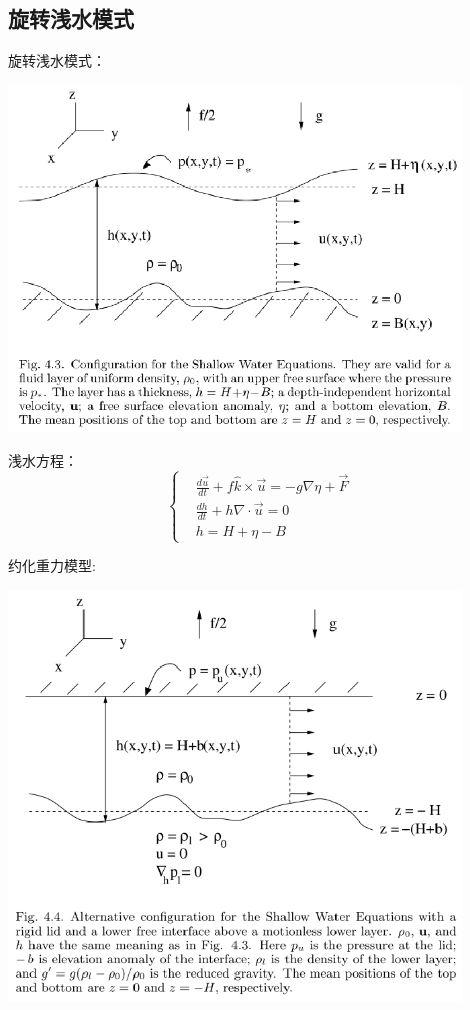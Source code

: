 \documentclass{article}
\begin{document}
\subsection{旋转浅水模式}
旋转浅水模式：
\begin{center}
    \includegraphics[width=12cm]{Fig3_1.png}
\end{center}

浅水方程：
$$\begin{cases}
    &\frac{d\vec{u}}{dt} + f\hat{k}\times\vec{u} = -g\nabla\eta + \vec{F}\\
    &\frac{dh}{dt} + h\nabla\cdot\vec{u} = 0\\
    &h=H+\eta-B
\end{cases}$$

约化重力模型:
\begin{center}
    \includegraphics[width=12cm]{Fig3_2.png}
\end{center}
\end{document}
